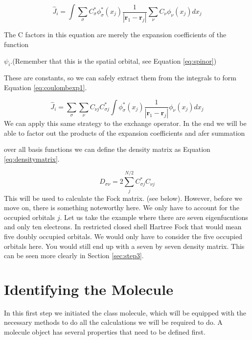 \begin{equation}\label{eq:coulombexp}
    \hat{J}_i = \int\sum_{\sigma}C^*_{\sigma}\phi^*_{\sigma}(x_j)\frac{1}{|\boldsymbol{r}_1 - \boldsymbol{r}_j|}\sum_{\nu}C_{\nu}\phi_{\nu}(x_j)dx_j
\end{equation}

The C factors in this equation are merely the expansion coefficients of the function

$\psi_i$.(Remember that this is the spatial orbital, see Equation \ref{eq:spinor})

These are constants, so we can safely extract them from the integrals to form
Equation \ref{eq:coulombexp1}.

\begin{equation}\label{eq:coulombexp1}
    \hat{J}_i = \sum_{\sigma}\sum_{\nu}C_{\nu j}C^*_{\sigma j}\int\phi^*_{\sigma}(x_j)\frac{1}{|\boldsymbol{r}_1 - \boldsymbol{r}_j|}\phi_{\nu}(x_j)dx_j
\end{equation}
We can apply this same strategy to the exchange operator. In the end we will be
able to factor out the products of the expansion coefficients and afer summation

over all basis functions we can define the density matrix as Equation 
\ref{eq:densitymatrix}.

\begin{equation}\label{eq:densitymatrix}
    D_{\sigma\nu} = 2\sum^{N/2}_jC_{\sigma j}^*C_{\nu j}
\end{equation}
This will be used to calculate the Fock matrix. (see below). However, before we 
move on, there is something noteworthy here. We only have to account for the 
occupied orbitals $j$. Let us take the example where there are seven eigenfucntions
and only ten electrons. In restricted closed shell Hartree Fock that would mean
five doubly occupied orbitals. We would only have to consider the five occupied
orbitals here. You would still end up with a seven by seven density matrix. This
can be seen more clearly in Section \ref{sec:step3}.

\section{Identifying the Molecule}
\label{sec:step1}
In this first step we initiated the class molecule, which will be equipped with 
the necessary methods to do all the calculations we will be required to do. 
A molecule object has several properties that need to be defined first. 



